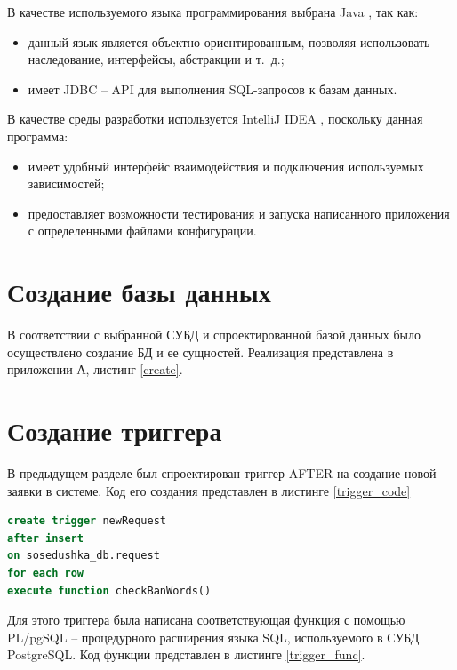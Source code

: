 В качестве используемого языка программирования выбрана Java \cite{java}, так как:
\begin{itemize}
	\item данный язык является объектно-ориентированным, позволяя использовать наследование, интерфейсы, абстракции и т.~д.;
	\item имеет JDBC \cite{jdbc} -- API для выполнения SQL-запросов к базам данных.
\end{itemize}

В качестве среды разработки используется IntelliJ IDEA \cite{intellij_idea}, поскольку данная программа:
\begin{itemize}
	\item имеет удобный интерфейс взаимодействия и подключения используемых зависимостей;
	\item предоставляет возможности тестирования и запуска написанного приложения с определенными файлами конфигурации.
\end{itemize}

\section*{Создание базы данных}

В соответствии с выбранной СУБД и спроектированной базой данных было осуществлено создание БД и ее сущностей. Реализация представлена в приложении А, листинг \ref{create}.

\section{Создание триггера}

В предыдущем разделе был спроектирован триггер AFTER на создание новой заявки в системе. Код его создания представлен в листинге \ref{trigger_code}

\captionsetup{singlelinecheck = false, justification=raggedright}
\begin{lstlisting}[language=sql, caption=Реализация триггера AFTER на добавление заявки, label=trigger_code]
create trigger newRequest
after insert 
on sosedushka_db.request 
for each row 
execute function checkBanWords()
\end{lstlisting}
\captionsetup{singlelinecheck = false, justification=centering}

Для этого триггера была написана соответствующая функция с помощью PL/pgSQL \cite{plpgsql} -- процедурного расширения языка SQL, используемого в СУБД PostgreSQL. Код функции представлен в листинге \ref{trigger_func}.

